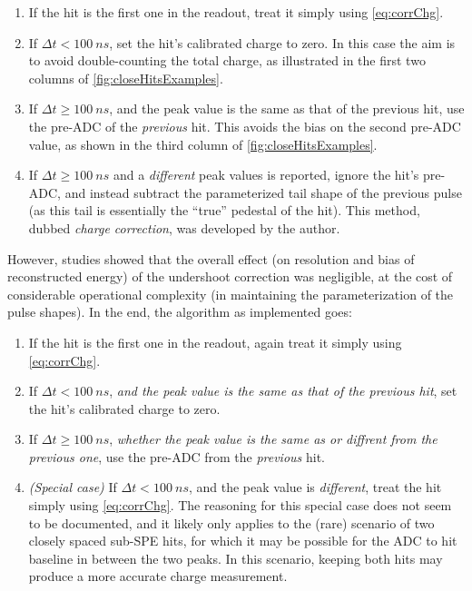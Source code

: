 \documentclass[../thesis.tex]{subfiles}
\begin{document}
\begin{enumerate}
\item If the hit is the first one in the readout, treat it simply using
  \eqref{eq:corrChg}.
\item If $\Delta t < \SI{100}{ns}$, set the hit's calibrated charge to zero. In
  this case the aim is to avoid double-counting the total charge, as illustrated
  in the first two columns of \autoref{fig:closeHitsExamples}.
\item If $\Delta t \ge \SI{100}{ns}$, and the peak value is the same as that of
  the previous hit, use the pre-ADC of the \emph{previous} hit. This avoids the
  bias on the second pre-ADC value, as shown in the third column of
  \autoref{fig:closeHitsExamples}.
\item If $\Delta t \ge \SI{100}{ns}$ and a \emph{different} peak values is
  reported, ignore the hit's pre-ADC, and instead subtract the parameterized
  tail shape of the previous pulse (as this tail is essentially the ``true''
  pedestal of the hit). This method, dubbed \emph{charge correction}, was
  developed by the author.
\end{enumerate}

However, studies showed that the overall effect (on resolution and bias of
reconstructed energy) of the undershoot correction was negligible, at the cost
of considerable operational complexity (in maintaining the parameterization of
the pulse shapes). In the end, the algorithm as implemented goes:

\begin{enumerate}
\item If the hit is the first one in the readout, again treat it simply using
  \eqref{eq:corrChg}.
\item If $\Delta t < \SI{100}{ns}$, \emph{and the peak value is the same as that
    of the previous hit}, set the hit's calibrated charge to zero.
\item If $\Delta t \ge \SI{100}{ns}$, \emph{whether the peak value is the same
    as or diffrent from the previous one}, use the pre-ADC from the
  \emph{previous} hit.
\item \emph{(Special case)} If $\Delta t < \SI{100}{ns}$, and the peak value is
  \emph{different}, treat the hit simply using \eqref{eq:corrChg}. The reasoning
  for this special case does not seem to be documented, and it likely only
  applies to the (rare) scenario of two closely spaced sub-SPE hits, for which
  it may be possible for the ADC to hit baseline in between the two peaks. In
  this scenario, keeping both hits may produce a more accurate charge
  measurement.
\end{enumerate}
\end{document}
